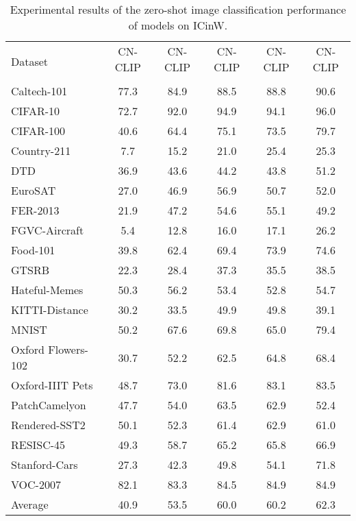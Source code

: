 \documentclass[11pt]{article}
\begin{document}
\begin{table*}[t]
\center
\small
\vskip 0.15in
\begin{adjustbox}{max width=1.\textwidth}
\begin{tabular}{@{\extracolsep{\fill}}lccccc}
\toprule
\multirow{2}{*}{Dataset} & CN-CLIP & CN-CLIP & CN-CLIP & CN-CLIP & CN-CLIP \\
 &  &  &  &  &  \\
\midrule
  Caltech-101  & 77.3 & 84.9 & 88.5 & 88.8 & 90.6  \\
  CIFAR-10  & 72.7 & 92.0 & 94.9 & 94.1 & 96.0  \\
  CIFAR-100   & 40.6 & 64.4 & 75.1 & 73.5 & 79.7  \\
  Country-211   & 7.7 & 15.2 & 21.0 & 25.4 & 25.3  \\
  DTD   & 36.9 & 43.6 & 44.2 & 43.8 & 51.2  \\
  EuroSAT   & 27.0 & 46.9 & 56.9 & 50.7 & 52.0  \\
  FER-2013   & 21.9 & 47.2 & 54.6 & 55.1 & 49.2  \\
  FGVC-Aircraft  & 5.4 & 12.8 & 16.0 & 17.1 & 26.2  \\
  Food-101   & 39.8 & 62.4 & 69.4 & 73.9 & 74.6  \\
  GTSRB   & 22.3 & 28.4 & 37.3 & 35.5 & 38.5  \\
  Hateful-Memes   & 50.3 & 56.2 & 53.4 & 52.8 & 54.7  \\
  KITTI-Distance  & 30.2 & 33.5 & 49.9 & 49.8 & 39.1  \\
  MNIST   & 50.2 & 67.6 &69.8 & 65.0 & 79.4  \\
  Oxford Flowers-102   & 30.7 & 52.2 &62.5 & 64.8 & 68.4  \\
  Oxford-IIIT Pets   & 48.7 & 73.0 &81.6 & 83.1 & 83.5  \\
  PatchCamelyon  & 47.7 & 54.0 & 63.5 & 62.9 & 52.4  \\
  Rendered-SST2  & 50.1 & 52.3 & 61.4 & 62.9 & 61.0  \\
  RESISC-45   & 49.3 & 58.7 & 65.2 & 65.8 & 66.9  \\
  Stanford-Cars  & 27.3 & 42.3 &49.8 & 54.1 & 71.8  \\
  VOC-2007  & 82.1 & 83.3 & 84.5 & 84.9 & 84.9  \\
  Average  & 40.9 & 53.5 & 60.0 & 60.2 & 62.3  \\
\bottomrule
\end{tabular}
\end{adjustbox}
\caption{Experimental results of the zero-shot image classification performance of models on ICinW. }
\label{tb:zs}
\end{table*}
\end{document}
